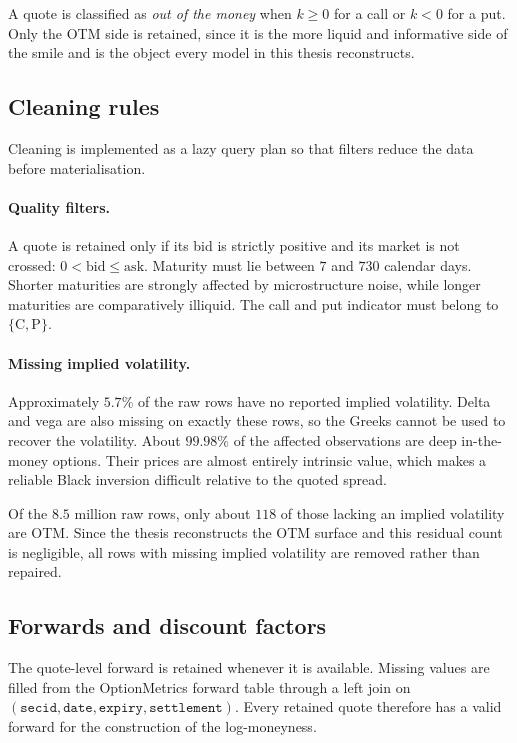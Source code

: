 A quote is classified as \emph{out of the money} when $k\ge0$ for a call or $k<0$ for a put.
Only the OTM side is retained, since it is the more liquid and informative side of the smile and
is the object every model in this thesis reconstructs.

\subsection{Cleaning rules}\label{sec:cleaning}

Cleaning is implemented as a lazy query plan so that filters reduce the data before
materialisation.

\paragraph{Quality filters.}
A quote is retained only if its bid is strictly positive and its market is not crossed: $0<\mathrm{bid}\le\mathrm{ask}.$
Maturity must lie between $7$ and $730$ calendar days. Shorter maturities are strongly affected
by microstructure noise, while longer maturities are comparatively illiquid. The call and put
indicator must belong to $\{\mathrm{C},\mathrm{P}\}$.

\paragraph{Missing implied volatility.}
Approximately $5.7\%$ of the raw rows have no reported implied volatility. Delta and vega are
also missing on exactly these rows, so the Greeks cannot be used to recover the volatility.
About $99.98\%$ of the affected observations are deep in-the-money options. Their prices are
almost entirely intrinsic value, which makes a reliable Black inversion difficult relative to
the quoted spread.

Of the $8.5$ million raw rows, only about $118$ of those lacking an implied volatility are OTM.
Since the thesis reconstructs the OTM surface and this residual count is negligible, all rows
with missing implied volatility are removed rather than repaired.

\subsection{Forwards and discount factors}\label{sec:forwards}

The quote-level forward is retained whenever it is available. Missing values are filled from
the OptionMetrics forward table through a left join on $(\texttt{secid},\texttt{date},\texttt{expiry},\texttt{settlement}).$
Every retained quote therefore has a valid forward for the construction of the log-moneyness.

